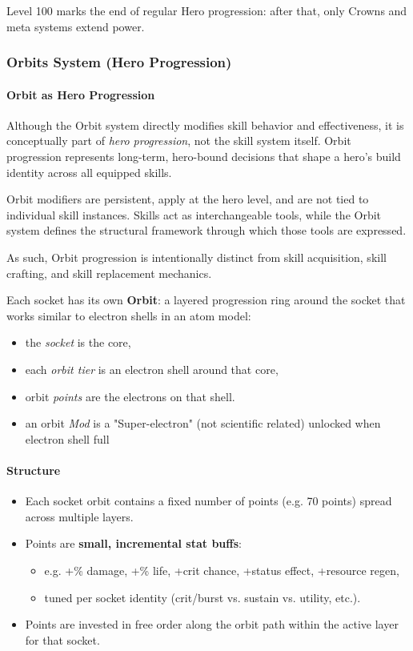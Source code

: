 Level 100 marks the end of regular Hero progression: after that, only Crowns and meta systems extend power.


\subsubsection{Orbits System (Hero Progression)}

\paragraph{Orbit as Hero Progression}

Although the Orbit system directly modifies skill behavior and effectiveness, it is conceptually part of \textit{hero progression}, not the skill system itself.
Orbit progression represents long-term, hero-bound decisions that shape a hero's build identity across all equipped skills.

Orbit modifiers are persistent, apply at the hero level, and are not tied to individual skill instances.
Skills act as interchangeable tools, while the Orbit system defines the structural framework through which those tools are expressed.

As such, Orbit progression is intentionally distinct from skill acquisition, skill crafting, and skill replacement mechanics.\\
\par
Each socket has its own \textbf{Orbit}: a layered progression ring around the socket that works similar to electron shells in an atom model:

\begin{itemize}
	\item the \emph{socket} is the core,
	\item each \emph{orbit tier} is an electron shell around that core,
	\item orbit \emph{points} are the electrons on that shell.
	\item an orbit \emph{Mod} is a "Super-electron" (not scientific related) unlocked when electron shell full
\end{itemize}

\paragraph{Structure}

\begin{itemize}
	\item Each socket orbit contains a fixed number of points (e.g. 70 points) spread across multiple layers.
	\item Points are \textbf{small, incremental stat buffs}:
	\begin{itemize}
		\item e.g. +\% damage, +\% life, +crit chance, +status effect, +resource regen,
		\item tuned per socket identity (crit/burst vs. sustain vs. utility, etc.).
	\end{itemize}
	\item Points are invested in free order along the orbit path within the active layer for that socket.
\end{itemize}

